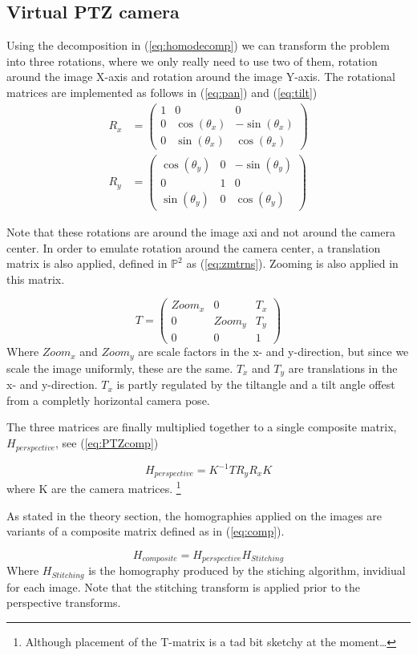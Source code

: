 \subsection{Virtual PTZ camera}
Using the decomposition in (\ref{eq:homodecomp}) we can transform the problem into three rotations, where we only really need to use two of them, rotation around the image X-axis and rotation around the image Y-axis. The rotational matrices are implemented as follows in (\ref{eq:pan}) and (\ref{eq:tilt})
	\begin{align}
		R_x &=\begin{pmatrix}1 & 0 & 0 \\
			0 & \cos(\theta_x) & -\sin(\theta_x) \\
			0 & \sin(\theta_x) & \cos(\theta_x)
		\end{pmatrix} \label{eq:pan}\\ 
		R_y&=\begin{pmatrix} \cos(\theta_y) & 0 & -\sin(\theta_y) \\
			0 & 1 & 0 \\
			\sin(\theta_y) & 0 & \cos(\theta_y)
		\end{pmatrix} \label{eq:tilt}
	\end{align}

	Note that these rotations are around the image axi and not around the camera center. In order to emulate rotation around the camera center, a translation matrix is also applied, defined in $\mathbb{P}^2$ as (\ref{eq:zmtrns}). Zooming is also applied in this matrix.

	\begin{equation}
		T=\begin{pmatrix} 
			Zoom_x & 0 & T_x \\ 
			0 & Zoom_y & T_y \\ 
			0 & 0 & 1 
		\end{pmatrix} \label{eq:zmtrns}
	\end{equation}
	Where $Zoom_x$ and $Zoom_y$ are scale factors in the x- and y-direction, but since we scale the image uniformly, these are the same. $T_x$ and $T_y$ are translations in the x- and y-direction. $T_x$ is partly regulated by the tiltangle and a tilt angle offest from a completly horizontal camera pose.

	The three matrices are finally multiplied together to a single composite matrix, $H_{perspective}$, see (\ref{eq:PTZcomp})

	\begin{equation}
		H_{perspective}=K^{-1}TR_yR_xK
		\label{eq:PTZcomp}
	\end{equation}
	where K are the camera matrices. \footnote{Although placement of the T-matrix is a tad bit sketchy at the moment\dots}

	As stated in the theory section, the homographies applied on the images are variants of a composite matrix defined as in (\ref{eq:comp}).

	\begin{equation}
		H_{composite}=H_{perspective}H_{Stitching}
		\label{eq:comp}
	\end{equation}
	Where $H_{Stitching}$ is the homography produced by the stiching algorithm, invidiual for each image. Note that the stitching transform is applied prior to the perspective transforms.
